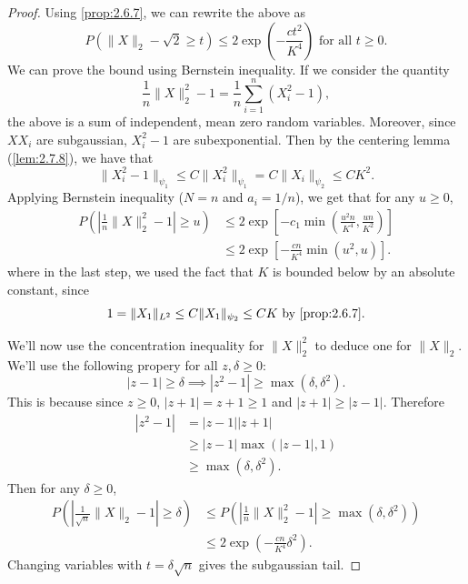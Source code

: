 \begin{proof}
Using \cref{prop:2.6.7}, we can rewrite the above as 
\[ P(\lVert X \rVert_2 - \sqrt{2} \geq t) \leq 2\exp{\left( -\frac{ct^2}{K^4} \right)} \text{ for all } 
t \geq 0. \]
We can prove the bound using Bernstein inequality. If we consider the quantity 
\[ \frac{1}{n}\lVert X \rVert_{2}^2 - 1 = \frac{1}{n}\sum_{i = 1}^{n} (X_i^2 - 1), \]
the above is a sum of independent, mean zero random variables. Moreover, since $XX_i$ are subgaussian, 
$X_i^2 - 1$ are subexponential. Then by the centering lemma (\cref{lem:2.7.8}), we have that 
\[ \lVert X_i^2 - 1 \rVert_{\psi_1} \leq C \lVert X_i^2 \rVert_{\psi_1} 
= C \lVert X_i \rVert_{\psi_2} \leq CK^2. \]
Applying Bernstein inequality ($N = n$ and $a_i = 1/n$), we get that for any $u \geq 0$, 
\begin{align*}
	P \left( \left| \frac{1}{n}\lVert X \rVert_{2}^2 - 1 \right| \geq u \right) 
	&\leq 2\exp{\left[ -c_1 \min_{} \left( \frac{u^2 n}{K^4}, \frac{un}{K^2} \right) \right]} \\
	&\leq 2 \exp{\left[ -\frac{cn}{K^4} \min_{}(u^2, u) \right]}.
\end{align*}
where in the last step, we used the fact that $K$ is bounded below by an absolute constant, since 
\[ 1 = \lVert X_1 \rVert_{L^2} \leq C \lVert X_1 \rVert_{\psi_2} \leq CK \text{ by } \cref{prop:2.6.7}. \]

We'll now use the concentration inequality for $\lVert X \rVert_{2}^2$ to deduce one for 
$\lVert X \rVert_{2}$. We'll use the following propery for all $z, \delta \geq 0$: 
\[ |z - 1| \geq \delta \implies |z^2 - 1| \geq \max_{}(\delta, \delta^2). \]
This is because since $z \geq 0$, $|z + 1| = z + 1 \geq 1$ and $|z + 1| \geq |z - 1|$. Therefore 
\begin{align*}
	|z^2 - 1| 
	&= |z - 1||z + 1| \\
	&\geq |z - 1| \max_{}(|z - 1|, 1) \\
	&\geq \max_{}(\delta, \delta^2).
\end{align*}
Then for any $\delta \geq 0$, 
\begin{align*}
	P \left( \left| \frac{1}{\sqrt{n}} \lVert X \rVert_{2} - 1 \right|  \geq \delta \right) 
	&\leq P \left( \left| \frac{1}{n} \lVert X \rVert_{2}^2 - 1 \right| \geq \max_{}(\delta, \delta^2) \right) \\
	&\leq 2\exp{\left( -\frac{cn}{K^4} \delta^2 \right)}.
\end{align*}
Changing variables with $t = \delta \sqrt{n}$ gives the subgaussian tail.
\end{proof}

